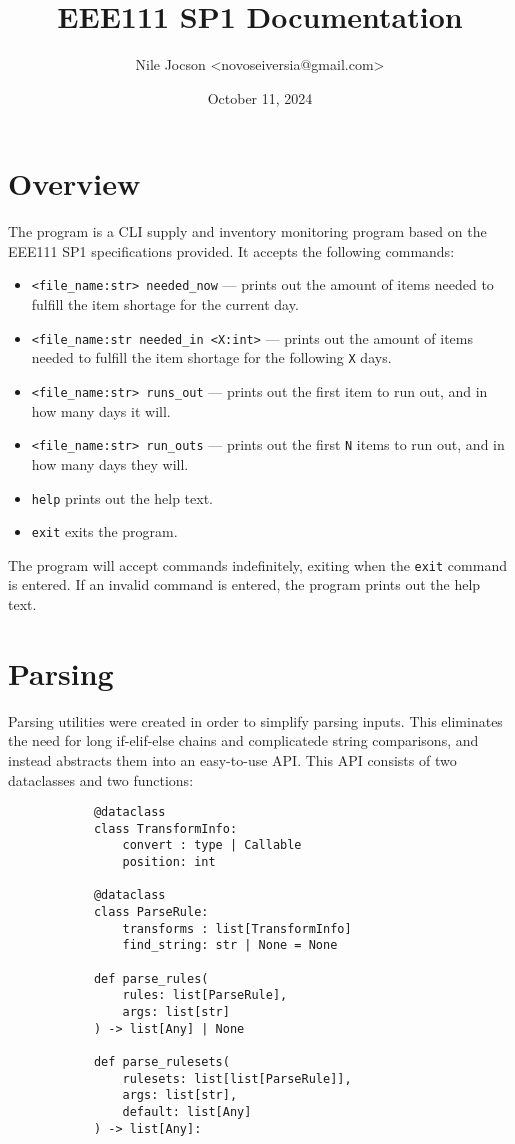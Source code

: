 \documentclass{article}
\title{EEE111 SP1 Documentation}
\author{Nile Jocson \textless{novoseiversia@gmail.com}\textgreater}
\date{October 11, 2024}
\begin{document}
	\maketitle
		\pagebreak



	\tableofcontents
		\pagebreak



	\section{Overview}
		The program is a CLI supply and inventory monitoring program based on
		the EEE111 SP1 specifications provided. It accepts the following commands:

		\begin{itemize}
			\item \verb|<file_name:str> needed_now| --- prints out the amount of items
			needed to fulfill the item shortage for the current day.
			\item \verb|<file_name:str needed_in <X:int>| --- prints out the amount of items
			needed to fulfill the item shortage for the following \verb|X| days.
			\item \verb|<file_name:str> runs_out| --- prints out the first item to run out, and
			in how many days it will.
			\item \verb|<file_name:str> run_outs| --- prints out the first \verb|N| items to run
			out, and in how many days they will.
			\item \verb|help| prints out the help text.
			\item \verb|exit| exits the program.
		\end{itemize}

		The program will accept commands indefinitely, exiting when the \verb|exit| command is
		entered. If an invalid command is entered, the program prints out the help text.

		\pagebreak

	\section{Parsing}
		Parsing utilities were created in order to simplify parsing inputs. This eliminates the
		need for long if-elif-else chains and complicatede string comparisons, and instead
		abstracts them into an easy-to-use API\@. This API consists of two dataclasses and
		two functions:

		\begin{verbatim}
			@dataclass
			class TransformInfo:
				convert : type | Callable
				position: int

			@dataclass
			class ParseRule:
				transforms : list[TransformInfo]
				find_string: str | None = None

			def parse_rules(
				rules: list[ParseRule],
				args: list[str]
			) -> list[Any] | None

			def parse_rulesets(
				rulesets: list[list[ParseRule]],
				args: list[str],
				default: list[Any]
			) -> list[Any]:
		\end{verbatim}
\end{document}
